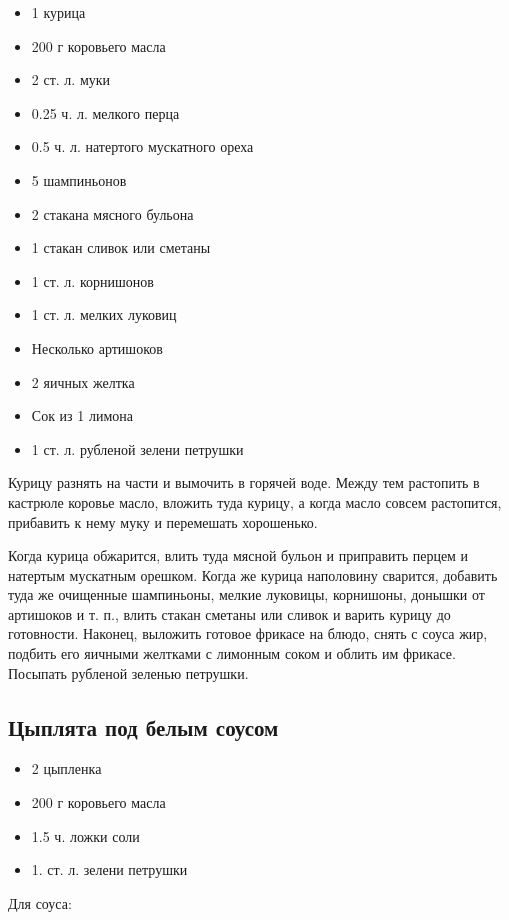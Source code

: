 \begin{itemize}
	\item 1 курица
    \item 200 г коровьего масла
    \item 2 ст. л. муки
    \item 0.25 ч. л. мелкого перца
    \item 0.5 ч. л. натертого мускатного ореха 
    \item 5 шампиньонов
    \item 2 стакана мясного бульона 
    \item 1 стакан сливок или сметаны
    \item 1 ст. л. корнишонов 
    \item 1 ст. л. мелких луковиц
    \item Несколько артишоков
    \item 2 яичных желтка
    \item Сок из 1 лимона
    \item 1 ст. л. рубленой зелени петрушки
\end{itemize}

Курицу разнять на части и вымочить в горячей воде. Между тем растопить в кастрюле коровье масло, вложить туда курицу, а когда масло совсем растопится, прибавить к нему муку и перемешать хорошенько.

Когда курица обжарится, влить туда мясной бульон и приправить перцем и натертым мускатным орешком. Когда же курица наполовину сварится, добавить туда же очищенные шампиньоны, мелкие луковицы, корнишоны, донышки от артишоков и т. п., влить стакан сметаны или сливок и варить курицу до готовности. Наконец, выложить готовое фрикасе на блюдо, снять с соуса жир, подбить его яичными желтками с лимонным соком и облить им фрикасе. Посыпать рубленой зеленью петрушки.

\subsection{Цыплята под белым соусом}

\begin{itemize}
	\item 2 цыпленка
    \item 200 г коровьего масла
    \item 1.5 ч. ложки соли
    \item 1. ст. л. зелени петрушки
\end{itemize}

Для соуса: 

